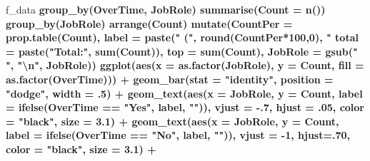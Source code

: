 \documentclass[
]{article}
\newenvironment{Shaded}{\begin{snugshade}}{\end{snugshade}}
\newcommand{\CharTok}[1]{\textcolor[rgb]{0.31,0.60,0.02}{#1}}
\newcommand{\DataTypeTok}[1]{\textcolor[rgb]{0.13,0.29,0.53}{#1}}
\newcommand{\DecValTok}[1]{\textcolor[rgb]{0.00,0.00,0.81}{#1}}
\newcommand{\FloatTok}[1]{\textcolor[rgb]{0.00,0.00,0.81}{#1}}
\newcommand{\KeywordTok}[1]{\textcolor[rgb]{0.13,0.29,0.53}{\textbf{#1}}}
\newcommand{\NormalTok}[1]{#1}
\newcommand{\OperatorTok}[1]{\textcolor[rgb]{0.81,0.36,0.00}{\textbf{#1}}}
\newcommand{\StringTok}[1]{\textcolor[rgb]{0.31,0.60,0.02}{#1}}
\begin{document}
\begin{Shaded}
\begin{Highlighting}[]
\NormalTok{f_data }\OperatorTok{%
\StringTok{  }\KeywordTok{group_by}\NormalTok{(OverTime, JobRole) }\OperatorTok{%
\StringTok{  }\KeywordTok{summarise}\NormalTok{(}\DataTypeTok{Count =} \KeywordTok{n}\NormalTok{()) }\OperatorTok{%
\StringTok{  }\KeywordTok{group_by}\NormalTok{(JobRole) }\OperatorTok{%
\StringTok{  }\KeywordTok{arrange}\NormalTok{(Count) }\OperatorTok{%
\StringTok{  }\KeywordTok{mutate}\NormalTok{(}\DataTypeTok{CountPer =} \KeywordTok{prop.table}\NormalTok{(Count), }
    \DataTypeTok{label =} \KeywordTok{paste}\NormalTok{(}\StringTok{" ("}\NormalTok{, }\KeywordTok{round}\NormalTok{(CountPer}\OperatorTok{*}\DecValTok{100}\NormalTok{,}\DecValTok{0}\NormalTok{), }\StringTok{"%
    \DataTypeTok{total =} \KeywordTok{paste}\NormalTok{(}\StringTok{"Total:"}\NormalTok{, }\KeywordTok{sum}\NormalTok{(Count)),}
    \DataTypeTok{top =} \KeywordTok{sum}\NormalTok{(Count),}
    \DataTypeTok{JobRole =} \KeywordTok{gsub}\NormalTok{(}\StringTok{" "}\NormalTok{, }\StringTok{"}\CharTok{\textbackslash{}n}\StringTok{"}\NormalTok{, JobRole)) }\OperatorTok{%
\StringTok{  }\KeywordTok{ggplot}\NormalTok{(}\KeywordTok{aes}\NormalTok{(}\DataTypeTok{x =} \KeywordTok{as.factor}\NormalTok{(JobRole), }\DataTypeTok{y =}\NormalTok{ Count, }\DataTypeTok{fill =} \KeywordTok{as.factor}\NormalTok{(OverTime))) }\OperatorTok{+}
\StringTok{  }\KeywordTok{geom_bar}\NormalTok{(}\DataTypeTok{stat =} \StringTok{"identity"}\NormalTok{, }\DataTypeTok{position =} \StringTok{"dodge"}\NormalTok{, }\DataTypeTok{width =} \FloatTok{.5}\NormalTok{) }\OperatorTok{+}
\StringTok{  }\KeywordTok{geom_text}\NormalTok{(}\KeywordTok{aes}\NormalTok{(}\DataTypeTok{x =}\NormalTok{ JobRole, }\DataTypeTok{y =}\NormalTok{ Count, }
    \DataTypeTok{label =} \KeywordTok{ifelse}\NormalTok{(OverTime }\OperatorTok{==}\StringTok{ "Yes"}\NormalTok{, label, }\StringTok{""}\NormalTok{)),}
    \DataTypeTok{vjust =} \FloatTok{-.7}\NormalTok{, }\DataTypeTok{hjust =} \FloatTok{.05}\NormalTok{, }\DataTypeTok{color =} \StringTok{"black"}\NormalTok{, }\DataTypeTok{size =} \FloatTok{3.1}\NormalTok{) }\OperatorTok{+}
\StringTok{  }\KeywordTok{geom_text}\NormalTok{(}\KeywordTok{aes}\NormalTok{(}\DataTypeTok{x =}\NormalTok{ JobRole, }\DataTypeTok{y =}\NormalTok{ Count, }
    \DataTypeTok{label =} \KeywordTok{ifelse}\NormalTok{(OverTime }\OperatorTok{==}\StringTok{ "No"}\NormalTok{, label, }\StringTok{""}\NormalTok{)),}
    \DataTypeTok{vjust =} \DecValTok{-1}\NormalTok{, }\DataTypeTok{hjust=}\NormalTok{.}\DecValTok{70}\NormalTok{, }\DataTypeTok{color =} \StringTok{"black"}\NormalTok{, }\DataTypeTok{size =} \FloatTok{3.1}\NormalTok{) }\OperatorTok{+}
}}}}}}}
\end{Highlighting}
\end{Shaded}
\end{document}

